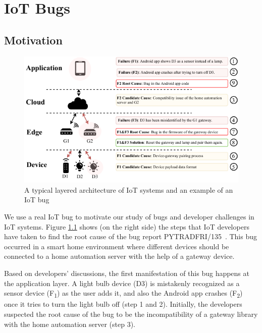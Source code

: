 
\chapter{IoT Bugs}
\label{ch:bugs}


\section{Motivation}

 \begin{figure}[t]
  \centering 
   \includegraphics[width=\linewidth]{./imgs/motiv.pdf}
  \caption{A typical layered architecture of IoT systems and an example of an IoT bug}
  \label{fig:arch}
\end{figure}


We use a real IoT bug to motivate our study of bugs and developer challenges in IoT systems. 
Figure \ref{fig:arch} shows (on the right side) the steps that IoT developers have taken to find the root cause of the bug report PYTRADFRI/135~\cite{iotbug:290}. This bug occurred in a smart home environment where different devices should be connected to a home automation server with the help of a gateway device.


Based on developers' discussions, the first manifestation of this bug happens at the application layer. A light bulb device (D3) is mistakenly recognized as a sensor device (F\textsubscript{1}) as the user adds it, and also the Android app crashes (F\textsubscript{2}) once it tries to turn the light bulb off (step 1 and 2). Initially, the developers suspected the root cause of the bug to be the incompatibility of a gateway library with the home automation server (step 3).


